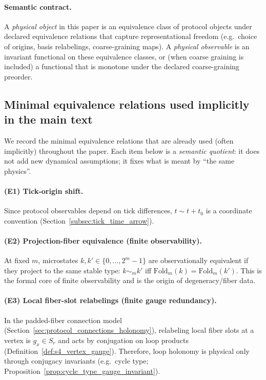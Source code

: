 \paragraph{Semantic contract.}
\InterfaceTag A \emph{physical object} in this paper is an equivalence class of protocol objects under declared equivalence relations that capture representational freedom (e.g.\ choice of origins, basis relabelings, coarse-graining maps).
A \emph{physical observable} is an invariant functional on these equivalence classes, or (when coarse graining is included) a functional that is monotone under the declared coarse-graining preorder.

\subsection{Minimal equivalence relations used implicitly in the main text}
\label{subsec:equivalence_relations_minimal}

We record the minimal equivalence relations that are already used (often implicitly) throughout the paper.
Each item below is a \emph{semantic quotient}: it does not add new dynamical assumptions; it fixes what is meant by ``the same physics''.

\paragraph{(E1) Tick-origin shift.}
\InterfaceTag Since protocol observables depend on tick differences, $t\sim t+t_0$ is a coordinate convention (Section~\ref{subsec:tick_time_arrow}).

\paragraph{(E2) Projection-fiber equivalence (finite observability).}
\MathTag At fixed $m$, microstates $k,k'\in\{0,\dots,2^m-1\}$ are observationally equivalent if they project to the same stable type:
$k\sim_m k'$ iff $\mathrm{Fold}_m(k)=\mathrm{Fold}_m(k')$.
This is the formal core of finite observability and is the origin of degeneracy/fiber data.

\paragraph{(E3) Local fiber-slot relabelings (finite gauge redundancy).}
\MathTag In the padded-fiber connection model (Section~\ref{sec:protocol_connections_holonomy}), relabeling local fiber slots at a vertex is $g_x\in S_r$ and acts by conjugation on loop products (Definition~\ref{def:s4_vertex_gauge}).
Therefore, loop holonomy is physical only through conjugacy invariants (e.g.\ cycle type; Proposition~\ref{prop:cycle_type_gauge_invariant}).

